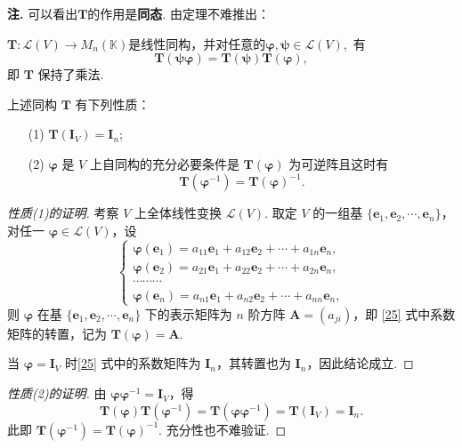 \documentclass[12pt, a4paper,newtx]{ctexart}
\newenvironment{remark}{\dbend\textbf{注. }}{}{}
\begin{document}
\begin{remark}
	可以看出$\bm T$的作用是\textbf{同态}. 
\end{remark}
由定理不难推出：
\begin{corollary}{}{}
	$\bm T : \mathcal{L}(V) \rightarrow M_n(\mathbb{K})$是线性同构，并对任意的$\bm\varphi, \bm\psi \in \mathcal{L}(V),$ 有
	\[
	\bm T(\bm{\psi \varphi}) = \bm T(\bm\psi)\bm T(\bm \varphi),
	\]
	即 $\bm T$ 保持了乘法. 
\end{corollary}
\begin{proposition}{}{}
	上述同构 $\bm{T}$ 有下列性质：
	\begin{enumerate}
		\item[(1)] $\bm{T}(\bm I_V) = \bm I_n$;
		\item[(2)]	$\bm \varphi$ 是 $V$ 上自同构的充分必要条件是 $\bm{T}(\bm \varphi)$ 为可逆阵且这时有
		\[
		\bm{T}(\bm\varphi^{-1}) = \bm{T}(\bm\varphi)^{-1}.
		\]
	\end{enumerate}
\end{proposition}
\begin{proof}[性质(1)的证明]
	考察 $ V $ 上全体线性变换 $ \mathcal{L}(V) $. 取定 $ V $ 的一组基 $ \{\bm{e}_1, \bm{e}_2, \cdots, \bm{e}_n\} $，对任一 $ \bm{\varphi} \in \mathcal{L}(V) $，设
	\begin{equation}\label{25}
		\begin{cases}
			\bm{\varphi}(\bm{e}_1) = a_{11}\bm{e}_1 + a_{12}\bm{e}_2 + \cdots + a_{1n}\bm{e}_n, \\
			\bm{\varphi}(\bm{e}_2) = a_{21}\bm{e}_1 + a_{22}\bm{e}_2 + \cdots + a_{2n}\bm{e}_n, \\
			\cdots \cdots \cdots \\
			\bm{\varphi}(\bm{e}_n) = a_{n1}\bm{e}_1 + a_{n2}\bm{e}_2 + \cdots + a_{nn}\bm{e}_n,
		\end{cases}
	\end{equation}
	则 $ \bm{\varphi} $ 在基 $ \{\bm{e}_1, \bm{e}_2, \cdots, \bm{e}_n\} $ 下的表示矩阵为 $ n $ 阶方阵 $ \bm A = (a_{ji}) $，即 \eqref{25} 式中系数矩阵的转置，记为 $ \bm T(\bm{\varphi}) = \bm A $. 
	
	当 $\bm\varphi = \bm I_V$ 时\eqref{25} 式中的系数矩阵为 $\bm I_n$，其转置也为 $\bm I_n$，因此结论成立. 
\end{proof}
\begin{proof}[性质(2)的证明]
	由 $\bm{\varphi} \bm{\varphi}^{-1} = \bm I_V$，得
	\[
	\bm{T}(\bm{\varphi})\bm{T}(\bm{\varphi}^{-1}) = \bm{T}(\bm{\varphi} \bm{\varphi}^{-1}) = \bm{T}(\bm I_V) = \bm I_n.
	\]
	此即 $\bm{T}(\bm{\varphi}^{-1}) = \bm{T}(\bm{\varphi})^{-1}$. 充分性也不难验证. 
\end{proof}
\end{document}
